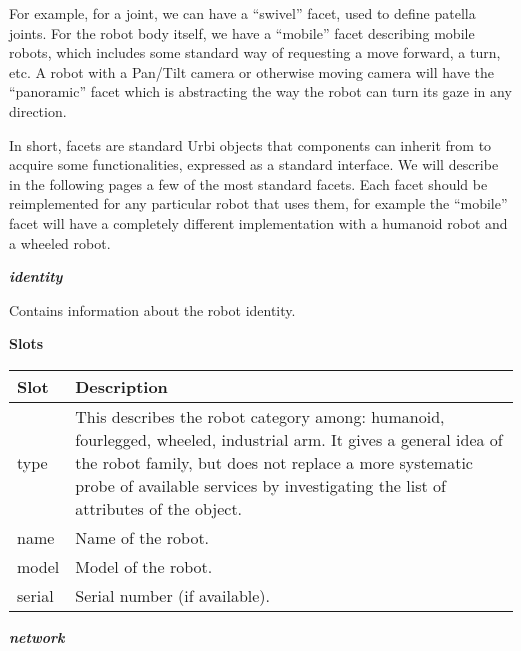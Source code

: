 \documentclass[a4paper]{article}
\begin{document}
{\sffamily
For example, for a joint, we can have a “swivel” facet, used to define
patella joints. For the robot body itself, we have a “mobile” facet
describing mobile robots, which includes some standard way of
requesting a move forward, a turn, etc. A robot with a Pan/Tilt camera
or otherwise moving camera will have the “panoramic” facet which is
abstracting the way the robot can turn its gaze in any direction.}

{\sffamily
In short, facets are standard Urbi objects that components can inherit
from to acquire some functionalities, expressed as a standard
interface. We will describe in the following pages a few of the most
standard facets. Each facet should be reimplemented for any particular
robot that uses them, for example the “mobile” facet will have a
completely different implementation with a humanoid robot and a wheeled
robot.}

{\sffamily\bfseries\itshape
identity}

{\sffamily
Contains information about the robot identity. }

{\sffamily\bfseries
Slots}

\begin{flushleft}
\tablehead{}
\begin{supertabular}{|m{2.8669999cm}|m{12.472cm}|}
\hline
{}\sffamily\bfseries Slot &
\sffamily\bfseries Description\\\hline
{} type &
\sffamily This describes the robot category
among: humanoid, fourlegged, wheeled, industrial arm. It gives a
general idea of the robot family, but does not replace a more
systematic probe of available services by investigating the list of
attributes of the object.\\\hline
{} name &
\sffamily Name of the robot.\\\hline
{} model &
\sffamily Model of the robot.\\\hline
{} serial &
\sffamily Serial number (if available).\\\hline
\end{supertabular}
\end{flushleft}
{\sffamily\bfseries\itshape
network}
\end{document}

